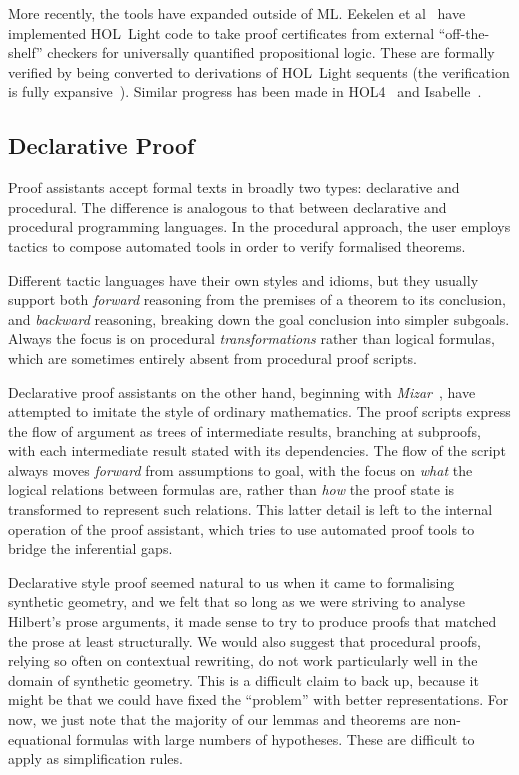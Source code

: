 More recently, the tools have expanded outside of ML. Eekelen et al~\cite{HOLLightBoolean} have implemented HOL~Light code to take proof certificates from external ``off-the-shelf'' checkers for universally quantified propositional logic. These are formally verified by being converted to derivations of HOL~Light sequents (the verification is fully expansive~\cite{FullyExpansive}). Similar progress has been made in HOL4~\cite{HOLBoolean} and Isabelle~\cite{IsabelleSledgehammer}.

\subsection{Declarative Proof}\label{sec:DeclarativeProof}
Proof assistants accept formal texts in broadly two types: declarative and procedural. The difference is analogous to that between declarative and procedural programming languages. In the procedural approach, the user employs tactics to compose automated tools in order to verify formalised theorems. 

Different tactic languages have their own styles and idioms, but they usually support both \emph{forward} reasoning from the premises of a theorem to its conclusion, and \emph{backward} reasoning, breaking down the goal conclusion into simpler subgoals. Always the focus is on procedural \emph{transformations} rather than logical formulas, which are sometimes entirely absent from procedural proof scripts.

Declarative proof assistants on the other hand, beginning with \emph{Mizar}~\cite{MizarMathematicalVernacular}, have attempted to imitate the style of ordinary mathematics. The proof scripts express the flow of argument as trees of intermediate results, branching at subproofs, with each intermediate result stated with its dependencies. The flow of the script always moves \emph{forward} from assumptions to goal, with the focus on \emph{what} the logical relations between formulas are, rather than \emph{how} the proof state is transformed to represent such relations. This latter detail is left to the internal operation of the proof assistant, which tries to use automated proof tools to bridge the inferential gaps.

Declarative style proof seemed natural to us when it came to formalising synthetic geometry, and we felt that so long as we were striving to analyse Hilbert's prose arguments, it made sense to try to produce proofs that matched the prose at least structurally. We would also suggest that procedural proofs, relying so often on contextual rewriting, do not work particularly well in the domain of synthetic geometry. This is a difficult claim to back up, because it might be that we could have fixed the ``problem'' with better representations. For now, we just note that the majority of our lemmas and theorems are non-equational formulas with large numbers of hypotheses. These are difficult to apply as simplification rules.


